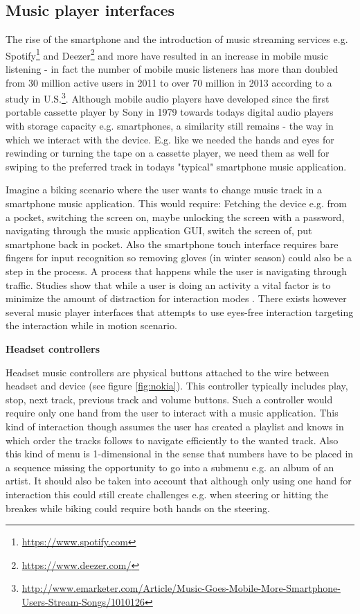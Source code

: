 \subsection{Music player interfaces}
\label{sec:alternativemusicuis}
The rise of the smartphone and the introduction of music streaming services e.g. Spotify\footnote{\url{https://www.spotify.com}} and Deezer\footnote{\url{https://www.deezer.com/}} and more have resulted in an increase in mobile music listening - in fact the number of mobile music listeners has more than doubled from 30 million active users in 2011 to over 70 million in 2013 according to a study in U.S.\footnote{\url{http://www.emarketer.com/Article/Music-Goes-Mobile-More-Smartphone-Users-Stream-Songs/1010126}}. Although mobile audio players have developed since the first portable cassette player by Sony in 1979 towards todays digital audio players with storage capacity e.g. smartphones, a similarity still remains - the way in which we interact with the device. E.g. like we needed the hands and eyes for rewinding or turning the tape on a cassette player, we need them as well for swiping to the preferred track in todays "typical" smartphone music application.

Imagine a biking scenario where the user wants to change music track in a smartphone music application. This would require: Fetching the device e.g. from a pocket, switching the screen on, maybe unlocking the screen with a password, navigating through the music application GUI, switch the screen of, put smartphone back in pocket. Also the smartphone touch interface requires bare fingers for input recognition so removing gloves (in winter season) could also be a step in the process. A process that happens while the user is navigating through traffic. Studies show that while a user is doing an activity a vital factor is to minimize the amount of distraction for interaction modes \cite{pascoe_using_2000}. There exists however several music player interfaces that attempts to use eyes-free interaction targeting the interaction while in motion scenario.

\textbf{Headset controllers}

Headset music controllers are physical buttons attached to the wire between headset and device (see figure \ref{fig:nokia}). This controller typically includes play, stop, next track, previous track and volume buttons. Such a controller would require only one hand from the user to interact with a music application. This kind of interaction though assumes the user has created a playlist and knows in which order the tracks follows to navigate efficiently to the wanted track. Also this kind of menu is 1-dimensional in the sense that numbers have to be placed in a sequence missing the opportunity to go into a submenu e.g. an album of an artist. It should also be taken into account that although only using one hand for interaction this could still create challenges e.g. when steering or hitting the breakes while biking could require both hands on the steering.

